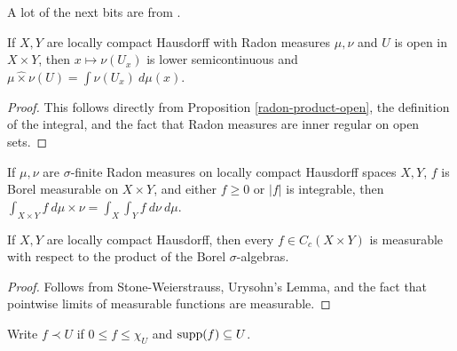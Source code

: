 A lot of the next bits are from \cite{folland}.

\begin{prop} If $X,Y$ are locally compact Hausdorff with Radon measures $\mu, \nu$ and $U$ is open in $X\times Y$, then $x \mapsto \nu(U_x)$ is lower semicontinuous and $\mu{\widehat\times}\nu(U) = \int \nu(U_x)\ d\mu(x)$.
\end{prop}
\begin{proof} This follows directly from Proposition \ref{radon-product-open}, the definition of the integral, and the fact that Radon measures are inner regular on open sets.
\end{proof}

\begin{thm} If $\mu,\nu$ are $\sigma$-finite Radon measures on locally compact Hausdorff spaces $X,Y$, $f$ is Borel measurable on $X\times Y$, and either $f \ge 0$ or $|f|$ is integrable, then $\int_{X\times Y} f\ d\mu{\widehat\times}\nu = \int_X \int_Y f\ d\nu\ d\mu$.
\end{thm}

\begin{prop} If $X,Y$ are locally compact Hausdorff, then every $f \in C_c(X\times Y)$ is measurable with respect to the product of the Borel $\sigma$-algebras.
\end{prop}
\begin{proof} Follows from Stone-Weierstrauss, Urysohn's Lemma, and the fact that pointwise limits of measurable functions are measurable.%
\end{proof}

\begin{defn} Write $f \prec U$ if $0 \le f \le \chi_U$ and $\operatorname{supp}(f) \subseteq U$.
\end{defn}

